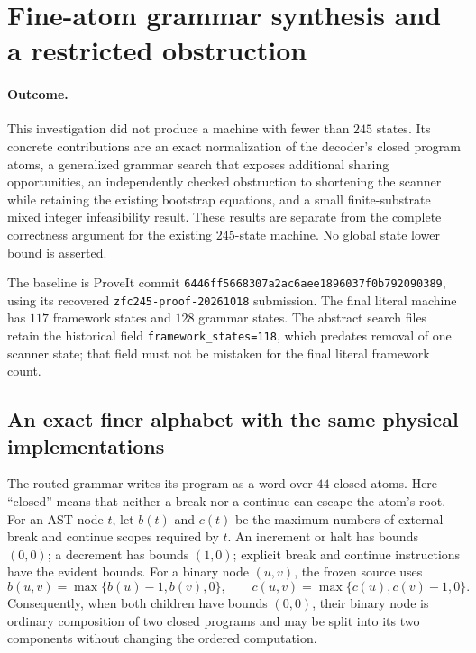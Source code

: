 \section{Fine-atom grammar synthesis and a restricted obstruction}
\label{sec:fine-atom-grammar}

\paragraph{Outcome.}
This investigation did not produce a machine with fewer than $245$ states.
Its concrete contributions are an exact normalization of the decoder's
closed program atoms, a generalized grammar search that exposes additional
sharing opportunities, an independently checked obstruction to shortening
the scanner while retaining the existing bootstrap equations, and a small
finite-substrate mixed integer infeasibility result. These results are
separate from the complete correctness argument for the existing $245$-state
machine. No global state lower bound is asserted.

The baseline is ProveIt commit
\texttt{6446ff5668307a2ac6aee1896037f0b792090389}, using its recovered
\texttt{zfc245-proof-20261018} submission. The final literal machine has
$117$ framework states and $128$ grammar states. The abstract search files
retain the historical field \texttt{framework\_states=118}, which predates
removal of one scanner state; that field must not be mistaken for the final
literal framework count.

\subsection{An exact finer alphabet with the same physical implementations}

The routed grammar writes its program as a word over $44$ closed atoms.
Here ``closed'' means that neither a break nor a continue can escape the
atom's root. For an AST node $t$, let $b(t)$ and $c(t)$ be the maximum numbers
of external break and continue scopes required by $t$. An increment or halt
has bounds $(0,0)$; a decrement has bounds $(1,0)$; explicit break and
continue instructions have the evident bounds. For a binary node $(u,v)$,
the frozen source uses
\[
 b(u,v)=\max\{b(u)-1,b(v),0\},\qquad
 c(u,v)=\max\{c(u),c(v)-1,0\}.
\]
Consequently, when both children have bounds $(0,0)$, their binary node is
ordinary composition of two closed programs and may be split into its two
components without changing the ordered computation.


